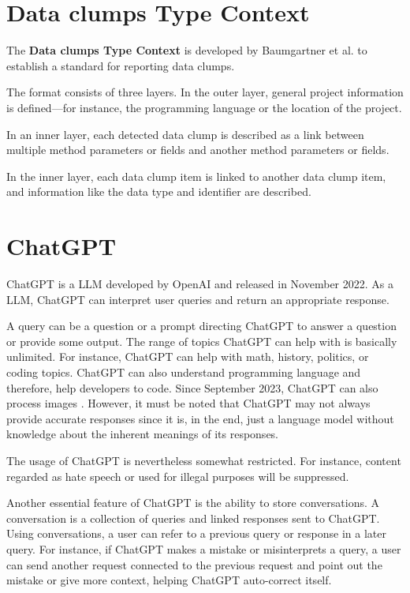 \section{ Data clumps Type Context }\label{sec:data_clump_format}

The \textbf{Data clumps Type Context} \cite{dataclump_type_context} is developed by Baumgartner et al. to establish a standard for reporting data clumps.

The format consists of three layers. In the outer layer, general project information is defined—for instance, the programming language or the location of the project.

In an inner layer, each detected data clump is described as a link between multiple method parameters or fields and another method parameters or fields. 

In the inner layer, each data clump item is linked to another data clump item, and information like the data type and identifier are described. 

\section{ChatGPT}\label{sec:chatgpt}

ChatGPT \cite{ChatGPT_url} is a \ac{LLM} developed by OpenAI and released in November 2022. As a \ac{LLM}, ChatGPT can interpret user queries and return an appropriate response. 

A query can be a question or a prompt directing ChatGPT to answer a question or provide some output. The range of topics ChatGPT can help with is basically unlimited. For instance, ChatGPT can help with math, history, politics, or coding topics. ChatGPT can also understand programming language and therefore, help developers to code. Since September 2023, ChatGPT can also process images \cite{ChatGPT_image}. However, it must be noted that ChatGPT may not always provide accurate responses since it is, in the end, just a language model without knowledge about the inherent meanings of its responses. 

The usage of ChatGPT is nevertheless somewhat restricted. For instance, content regarded as hate speech or used for illegal purposes will be suppressed.

Another essential feature of ChatGPT is the ability to store conversations. A conversation is a collection of queries and linked responses sent to ChatGPT. Using conversations, a user can refer to a previous query or response in a later query. For instance, if ChatGPT makes a mistake or misinterprets a query, a user can send another request connected to the previous request and point out the mistake or give more context, helping ChatGPT auto-correct itself. 

